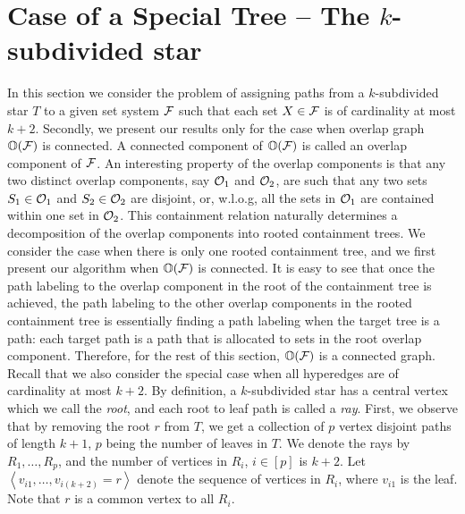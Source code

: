 \documentclass[11pt,
               envcountsect,
               envcountsame]
               {../lib/llncs2e/llncs}
\def\cF{{\cal F}}
\def\cO{{\cal O}}
\def\bI{\mathbb I}
\def\bO{\mathbb O}
\def\overlap{\between}
\newcommand{\seq}[1]{\left\langle #1 \right\rangle}
\begin{document}
\section{Case of a Special Tree -- The $k$-subdivided star}
\label{sec:ksubdivstar}
In this section we consider the problem of assigning paths from a
$k$-subdivided star $T$ to a given set system $\cF$ such that each set
$X \in \cF$ is of cardinality at most $k+2$.  Secondly, we present our
results only for the case when overlap graph $\bO(\cF)$ is connected.
A connected component of $\bO(\cF)$ is called an overlap component of
$\cF$.  An interesting property of the overlap components is that any
two distinct overlap components, say $\cO_1$ and $\cO_2$, are such
that any two sets $S_1 \in \cO_1$ and $S_2 \in \cO_2$ are disjoint,
or, w.l.o.g, all the sets in $\cO_1$ are contained within one set in
$\cO_2$.  This containment relation naturally determines a
decomposition of the overlap components into rooted containment trees.
We consider the case when there is only one rooted containment tree,
and we first present our algorithm when $\bO(\cF)$ is connected.  It
is easy to see that once the path labeling to the overlap component in
the root of the containment tree is achieved, the path labeling to the
other overlap components in the rooted containment tree is essentially
finding a path labeling when the target tree is a path: each target
path is a path that is allocated to sets in the root overlap
component.  Therefore, for the rest of this section, $\bO(\cF)$ is a
connected graph. Recall that we also consider the special case when
all hyperedges are of cardinality at most $k+2$.  By definition, a
$k$-subdivided star has a central vertex which we call the {\em root},
and each root to leaf path is called a {\em ray}.  First, we observe
that by removing the root $r$ from $T$, we get a collection of $p$
vertex disjoint paths of length $k+1$, $p$ being the number of leaves
in $T$.  We denote the rays by $R_1, \ldots, R_p$, and the number of
vertices in $R_i$, $i \in [p]$ is $k+2$.  Let
$\seq{v_{i1},\ldots,v_{i(k+2)}=r}$ denote the sequence of vertices in
$R_i$, where $v_{i1}$ is the leaf. Note that $r$ is a common vertex to
all $R_i$.
  
\end{document}
